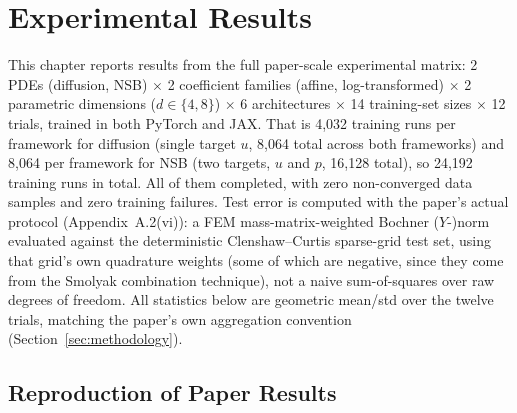 \cleardoubleoddpage%
\chapter{Experimental Results}
\label{sec:experimentalresults}

This chapter reports results from the full paper-scale experimental matrix:
2 PDEs (diffusion, NSB) $\times$ 2 coefficient families (affine,
log-transformed) $\times$ 2 parametric dimensions ($d \in \{4,8\}$)
$\times$ 6 architectures $\times$ 14 training-set sizes $\times$ 12 trials,
trained in both PyTorch and JAX. That is 4,032 training runs per framework
for diffusion (single target $u$, 8,064 total across both frameworks) and
8,064 per framework for NSB (two targets, $u$ and $p$, 16,128 total), so
24,192 training runs in total. All of them completed, with zero
non-converged data samples and zero training failures. Test error is
computed with the paper's actual protocol (Appendix~A.2(vi)): a FEM
mass-matrix-weighted Bochner ($Y$-)norm evaluated against the deterministic
Clenshaw--Curtis sparse-grid test set, using that grid's own quadrature
weights (some of which are negative, since they come from the Smolyak
combination technique), not a naive sum-of-squares over raw degrees of
freedom. All statistics below are geometric mean/std over the twelve
trials, matching the paper's own aggregation convention
(Section~\ref{sec:methodology}).

\section{Reproduction of Paper Results}

